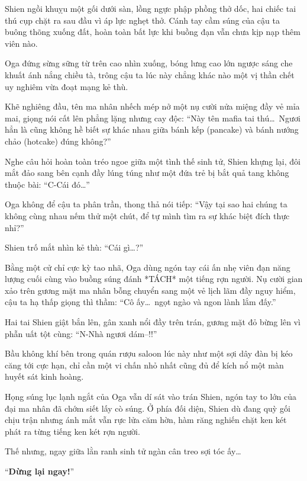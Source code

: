 \documentclass[../main.tex]{subfiles}
\begin{document}
Shien ngồi khuỵu một gối dưới sàn, lồng ngực phập phồng thở dốc, hai chiếc tai thú cụp chặt ra sau đầu vì áp lực nghẹt thở. Cánh tay cầm súng của cậu ta buông thõng xuống đất, hoàn toàn bất lực khi buồng đạn vẫn chưa kịp nạp thêm viên nào.

Oga đứng sừng sững từ trên cao nhìn xuống, bóng lưng cao lớn ngược sáng che khuất ánh nắng chiều tà, trông cậu ta lúc này chẳng khác nào một vị thần chết uy nghiêm vừa đoạt mạng kẻ thù.


Khẽ nghiêng đầu, tên ma nhân nhếch mép nở một nụ cười nửa miệng đầy vẻ mỉa mai, giọng nói cất lên phẳng lặng nhưng cay độc: ``Này tên mafia tai thú\dots\ Ngươi hẳn là cũng không hề biết sự khác nhau giữa bánh kếp (pancake) và bánh nướng chảo (hotcake) đúng không?''

Nghe câu hỏi hoàn toàn tréo ngoe giữa một tình thế sinh tử, Shien khựng lại, đôi mắt đảo sang bên cạnh đầy lúng túng như một đứa trẻ bị bắt quả tang không thuộc bài: ``C-Cái đó\dots''

Oga không để cậu ta phân trần, thong thả nói tiếp: ``Vậy tại sao hai chúng ta không cùng nhau nếm thử một chút, để tự mình tìm ra sự khác biệt đích thực nhỉ?''

Shien trố mắt nhìn kẻ thù: ``Cái gì\dots?''

Bằng một cử chỉ cực kỳ tao nhã, Oga dùng ngón tay cái ấn nhẹ viên đạn năng lượng cuối cùng vào buồng súng đánh *TÁCH* một tiếng rợn người. Nụ cười gian xảo trên gương mặt ma nhân bỗng chuyển sang một vẻ lịch lãm đầy nguy hiểm, cậu ta hạ thấp giọng thì thầm: ``Cô ấy\dots\ ngọt ngào và ngon lành lắm đấy.''

Hai tai Shien giật bắn lên, gân xanh nổi đầy trên trán, gương mặt đỏ bừng lên vì phẫn uất tột cùng: ``N-Nhà ngươi dám--!!''

Bầu không khí bên trong quán rượu saloon lúc này như một sợi dây đàn bị kéo căng tới cực hạn, chỉ cần một vi chấn nhỏ nhất cũng đủ để kích nổ một màn huyết sát kinh hoàng.

Họng súng lục lạnh ngắt của Oga vẫn dí sát vào trán Shien, ngón tay to lớn của đại ma nhân đã chớm siết lấy cò súng. Ở phía đối diện, Shien dù đang quỳ gối chịu trận nhưng ánh mắt vẫn rực lửa căm hờn, hàm răng nghiến chặt ken két phát ra từng tiếng ken két rợn người.

Thế nhưng, ngay giữa lằn ranh sinh tử ngàn cân treo sợi tóc ấy\dots

``\textbf{Dừng lại ngay!}''

\il
\end{document}
